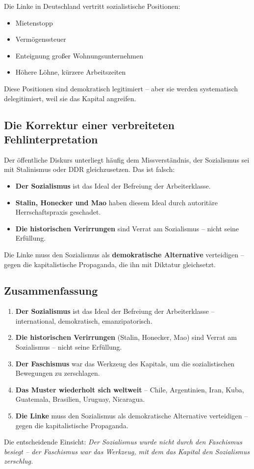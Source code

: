 Die Linke in Deutschland vertritt sozialistische Positionen:

\begin{itemize}
    \item Mietenstopp
    \item Vermögenssteuer
    \item Enteignung großer Wohnungsunternehmen
    \item Höhere Löhne, kürzere Arbeitszeiten
\end{itemize}

Diese Positionen sind demokratisch legitimiert – aber sie werden systematisch delegitimiert, weil sie das Kapital angreifen.

\subsection{Die Korrektur einer verbreiteten Fehlinterpretation}

Der öffentliche Diskurs unterliegt häufig dem Missverständnis, der Sozialismus sei mit Stalinismus oder DDR gleichzusetzen. Das ist falsch:

\begin{itemize}
    \item \textbf{Der Sozialismus} ist das Ideal der Befreiung der Arbeiterklasse.
    \item \textbf{Stalin, Honecker und Mao} haben diesem Ideal durch autoritäre Herrschaftspraxis geschadet.
    \item \textbf{Die historischen Verirrungen} sind Verrat am Sozialismus – nicht seine Erfüllung.
\end{itemize}

Die Linke muss den Sozialismus als \textbf{demokratische Alternative} verteidigen – gegen die kapitalistische Propaganda, die ihn mit Diktatur gleichsetzt.

\subsection{Zusammenfassung}

\begin{enumerate}
    \item \textbf{Der Sozialismus} ist das Ideal der Befreiung der Arbeiterklasse – international, demokratisch, emanzipatorisch.
    \item \textbf{Die historischen Verirrungen} (Stalin, Honecker, Mao) sind Verrat am Sozialismus – nicht seine Erfüllung.
    \item \textbf{Der Faschismus} war das Werkzeug des Kapitals, um die sozialistischen Bewegungen zu zerschlagen.
    \item \textbf{Das Muster wiederholt sich weltweit} – Chile, Argentinien, Iran, Kuba, Guatemala, Brasilien, Uruguay, Nicaragua.
    \item \textbf{Die Linke} muss den Sozialismus als demokratische Alternative verteidigen – gegen die kapitalistische Propaganda.
\end{enumerate}

Die entscheidende Einsicht: \emph{Der Sozialismus wurde nicht durch den Faschismus besiegt – der Faschismus war das Werkzeug, mit dem das Kapital den Sozialismus zerschlug.}